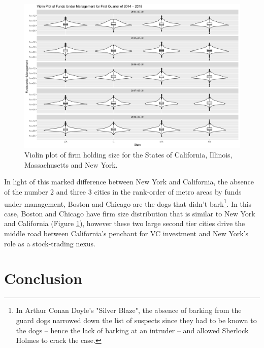 \begin{figure}
    \centering
	\includegraphics[width=1\linewidth]{Figures/ChapterV/Violinplot_q1}
	\caption[Violin Plot of Firm Holding Size for CA, IL, MA and NY.]{Violin plot of firm holding size for the States of California, Illinois, Massachusetts and New York.}
	\label{fig:violinplotq1}
\end{figure}


In light of this marked difference between New York and California, the absence of the number 2 and three 3 cities in the rank-order of metro areas by funds under management, Boston and Chicago are the dogs that didn't bark\footnote{In Arthur Conan Doyle's "Silver Blaze", the absence of barking from the guard dogs narrowed down the list of suspects since they had to be known to the dogs -- hence the lack of barking at an intruder -- and allowed Sherlock Holmes to crack the case.}.  In this case, Boston and Chicago have firm size distribution that is similar to New York and California (Figure \ref{fig:violinplotq1}), however these two large second tier cities drive the middle road between California's penchant for VC investment and New York's role as a stock-trading  nexus.

\section{Conclusion}

